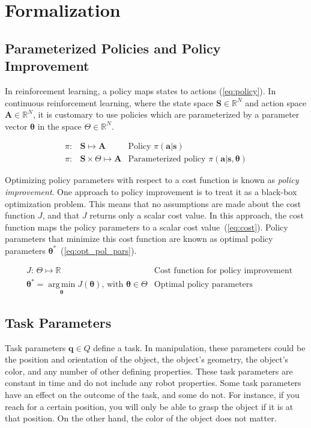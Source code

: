 \documentclass[12pt]{article}
\newcommand{\mymath}[1]{\ensuremath{#1}\xspace}
\newcommand{\act}    {\mymath{\mathbf{a}}}
\newcommand{\actsp}  {\mymath{\mathbf{A}}}
\newcommand{\sta}    {\mymath{\mathbf{s}}}
\newcommand{\stasp}  {\mymath{\mathbf{S}}}
\newcommand{\app}    {\mymath{\bm{\theta}}}
\newcommand{\appsp}  {\mymath{\Theta}}
\newcommand{\taskp}  {\mymath{\mathbf{q}}}
\newcommand{\taskpsp}{\mymath{Q}}
\newcommand{\costf}  {\mymath{J}}
\DeclareMathOperator*{\argmin}{arg\,min}
\newcommand{\argminvar}[1]{\ensuremath{\underset{#1}{{\argmin}}}}
\begin{document}
\section{Formalization}

\subsection{Parameterized Policies and Policy Improvement}
\label{sec:parameterized_policies}

In reinforcement learning, a policy maps states to actions (\ref{eq:policy}). In continuous reinforcement learning, where the state space $\stasp \in \mathbb{R}^N$ and action space $\actsp \in \mathbb{R}^N$,  it is customary to use policies which are parameterized by a parameter vector \app in the space $\appsp  \in \mathbb{R}^N$.

\begin{align}
\label{eq:policy}     \pi:& \stasp               \mapsto \actsp & \mbox{Policy~} \pi(\act|\sta)\\
\label{eq:policy_par} \pi:& \stasp \times \appsp \mapsto \actsp & \mbox{Parameterized policy~} \pi(\act|\sta,\app)
\end{align}


Optimizing policy parameters with respect to a cost function is known as \emph{policy improvement}. 
One approach to policy improvement is to treat it as a black-box optimization problem. This means that no assumptions are made about the cost function $J$, and that $J$ returns only a scalar cost value. In this approach, the cost function maps the policy parameters to a scalar cost value~(\ref{eq:cost}). Policy parameters that minimize this cost function are known as optimal policy parameters $\app^*$~(\ref{eq:opt_pol_pars}).

\begin{align}
& \costf\mbox{: } \appsp \mapsto \mathbb{R}&\mbox{Cost function for policy improvement}\label{eq:cost}\\
& \app^* = \argminvar{\app}\costf(\app) \mbox{,~with~} \app\in\appsp  & \mbox{Optimal policy parameters}\label{eq:opt_pol_pars}
\end{align}

\subsection{Task Parameters}

Task parameters $\taskp\in\taskpsp$ define a task. In manipulation, these parameters could be the position and orientation of the object, the object's geometry, the object's color, and any number of other defining properties. These task parameters are constant in time and do not include any robot properties.
Some task parameters have an effect on the outcome of the task, and some do not. For instance, if you reach for a certain position, you will only be able to grasp the object if it is at that position. On the other hand, the color of the object does not matter. 
\end{document}
